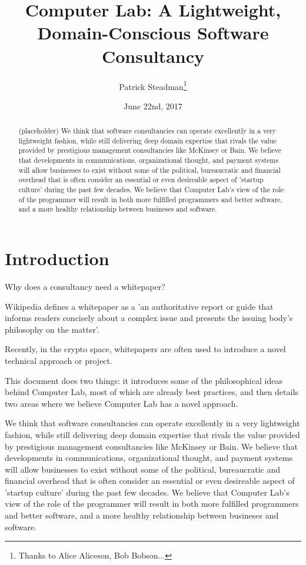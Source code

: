 \documentclass[12pt]{article}
\title{Computer Lab: A Lightweight, Domain-Conscious Software Consultancy}
\author{Patrick Steadman\thanks{Thanks to Alice Aliceson, Bob Bobson...}}
\date{June 22nd, 2017}
\begin{document}
\maketitle

\begin{abstract}
(placeholder)
We think that software consultancies can operate excellently in a very
lightweight fashion, while still delivering deep domain expertise that rivals
the value provided by prestigious management consultancies like McKinsey or
Bain. We believe that developments in communications, organizational thought,
and payment systems will allow businesses to exist without some of the
political, bureaucratic and financial overhead that is often consider an
essential or even desireable aspect of 'startup culture' during the past few
decades. We believe that Computer Lab's view of the role of the programmer will
result in both more fulfilled programmers and better software, and a more
healthy relationship between busineses and software.
\end{abstract}

\section{Introduction}

Why does a consultancy need a whitepaper?

Wikipedia defines a whitepaper as a 'an authoritative report or guide that
informs readers concisely about a complex issue and presents the issuing body's
philosophy on the matter'.

Recently, in the crypto space, whitepapers are often used to introduce a novel
technical approach or project.

This document does two things: it introduces some of the philosophical ideas
behind Computer Lab, most of which are already best practices, and then details
two areas where we believe Computer Lab has a novel approach.

We think that software consultancies can operate excellently in a very
lightweight fashion, while still delivering deep domain expertise that rivals
the value provided by prestigious management consultancies like McKinsey or
Bain. We believe that developments in communications, organizational thought,
and payment systems will allow businesses to exist without some of the
political, bureaucratic and financial overhead that is often consider an
essential or even desireable aspect of 'startup culture' during the past few
decades. We believe that Computer Lab's view of the role of the programmer will
result in both more fulfilled programmers and better software, and a more
healthy relationship between busineses and software.
\end{document}
